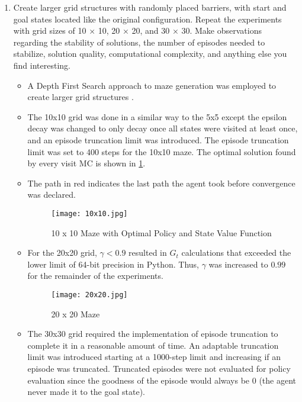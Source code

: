 \documentclass[letterpaper]{article} %
\begin{document}
\begin{enumerate}
    \item Create larger grid structures with randomly placed barriers, with start and goal states located like the original configuration. Repeat the experiments with grid sizes of 10 × 10, 20 × 20, and 30 × 30. Make observations regarding the stability of solutions, the number of episodes needed to stabilize, solution quality, computational complexity, and anything else you find interesting.
	\begin{itemize}
	    \item A Depth First Search approach to maze generation was employed to create larger grid structures \cite{CopeMazeGenerationDFS}.
	    \item The 10x10 grid was done in a similar way to the 5x5 except the epsilon decay was changed to only decay once all states were visited at least once, and an episode truncation limit was introduced. The episode truncation limit was set to 400 steps for the 10x10 maze. The optimal solution found by every visit MC is shown in \ref{fig:10x10_solution}.
	    \item The path in red indicates the last path the agent took before convergence was declared.

	    \begin{figure}[htbp]
	      \centering
	      \texttt{[image: 10x10.jpg]}
		\caption{10 x 10 Maze with Optimal Policy and State Value Function}
	      \label{fig:10x10_solution}
	    \end{figure}

	    \item For the 20x20 grid, $\gamma < 0.9$ resulted in $G_t$ calculations that exceeded the lower limit of 64-bit precision in Python. Thus, $\gamma$ was increased to $0.99$ for the remainder of the experiments.

	    \begin{figure}[htbp]
	      \centering
	      \texttt{[image: 20x20.jpg]}
		\caption{20 x 20 Maze}
	      \label{fig:20x20_solution}
	    \end{figure}

	    \item The 30x30 grid required the implementation of episode truncation to complete it in a reasonable amount of time. An adaptable truncation limit was introduced starting at a 1000-step limit and increasing if an episode was truncated. Truncated episodes were not evaluated for policy evaluation since the goodness of the episode would always be 0 (the agent never made it to the goal state).


\end{itemize}
\end{enumerate}
\end{document}
